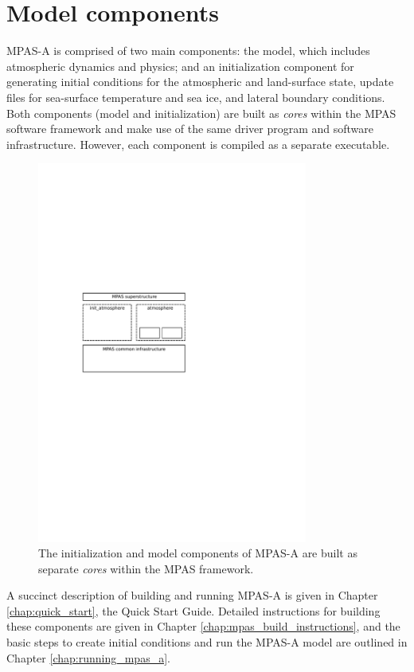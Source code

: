 \section{Model components}

MPAS-A is comprised of two main components: the model, which includes
atmospheric dynamics and physics; and an initialization component for
generating initial conditions for the atmospheric and land-surface state, update files for sea-surface
temperature and sea ice, and lateral boundary conditions. Both components (model and initialization)
are built as {\it cores} within the MPAS software framework and make use of the same driver
program and software infrastructure.  However, each component is compiled as
a separate executable.

\begin{figure}[htb]
\begin{center}
\includegraphics[width=3.5in]{figures/mpas-a_components.pdf}
\caption{The initialization and model components of MPAS-A are built as
separate {\em cores} within the MPAS framework.}
\label{fig:atm_components}
\end{center}
\end{figure}

A succinct description of building and running MPAS-A is given in Chapter \ref{chap:quick_start}, the Quick Start Guide.
Detailed instructions for building these components are given in Chapter
\ref{chap:mpas_build_instructions}, and the basic steps to create initial
conditions and run the MPAS-A model are outlined in Chapter
\ref{chap:running_mpas_a}.
